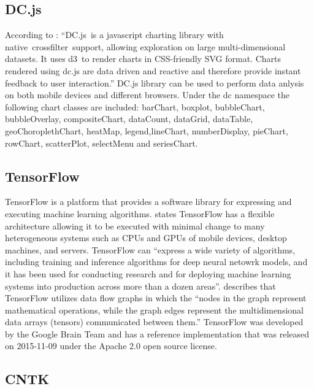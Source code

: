 \subsection{DC.js}

    According to \cite{www-dcjs}: ``DC.js is a javascript charting
    library with native crossfilter support, allowing exploration on
    large multi-dimensional datasets. It uses d3 to render charts in
    CSS-friendly SVG format. Charts rendered using dc.js are data
    driven and reactive and therefore provide instant feedback to user
    interaction.'' DC.js library can be used to perform data anlysis
    on both mobile devices and different browsers. Under the dc
    namespace the following chart classes are included: barChart,
    boxplot, bubbleChart, bubbleOverlay, compositeChart, dataCount,
    dataGrid, dataTable, geoChoroplethChart, heatMap,
    legend,lineChart, numberDisplay, pieChart, rowChart, scatterPlot,
    selectMenu and seriesChart.
      
\subsection{TensorFlow \cv}

    TensorFlow is a platform that provides a software library for
    expressing and executing machine learning
    algorithms. \cite{tensorflow-paper-2016} states TensorFlow has a
    flexible architecture allowing it to be executed with minimal
    change to many heterogeneous systems such as CPUs and GPUs of mobile
    devices, desktop machines, and servers. TensorFlow can ``express a
    wide variety of algorithms, including training and inference
    algorithms for deep neural netowrk models, and it has been used
    for conducting research and for deploying machine learning systems
    into production across more than a dozen
    areas''. \cite{www-tensorflow} describes that TensorFlow utilizes
    data flow graphs in which the ``nodes in the graph represent
    mathematical operations, while the graph edges represent the
    multidimensional data arrays (tensors) communicated between them.''
    TensorFlow was developed by the Google Brain Team and has a
    reference implementation that was released on 2015-11-09 under the
    Apache 2.0 open source license.
    
\subsection{CNTK}

